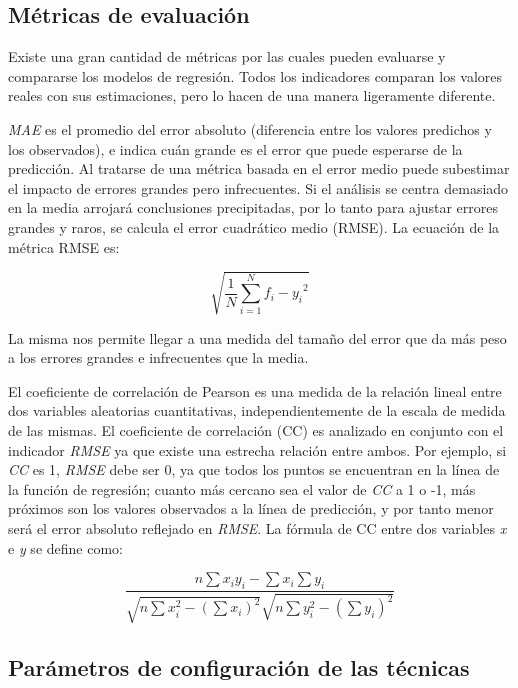 \subsection{Métricas de evaluación\label{subsec:M=0000E9tricas-de-evaluaci=0000F3n}}

Existe una gran cantidad de métricas por las cuales pueden evaluarse
y compararse los modelos de regresión. Todos los indicadores comparan
los valores reales con sus estimaciones, pero lo hacen de una manera
ligeramente diferente. 

\emph{\ac{MAE}} es el promedio del error absoluto (diferencia entre
los valores predichos y los observados), e indica cuán grande es el
error que puede esperarse de la predicción. Al tratarse de una métrica
basada en el error medio puede subestimar el impacto de errores grandes
pero infrecuentes. Si el análisis se centra demasiado en la media
arrojará conclusiones precipitadas, por lo tanto para ajustar errores
grandes y raros, se calcula el error cuadrático medio (\ac{RMSE}).
La ecuación de la métrica \ac{RMSE} es:

\[ \sqrt{\frac{1}{N}\sum_{i=1}^{N}{f_i-y_i}^2}
\]

La misma nos permite llegar a una medida del tamaño del error que
da más peso a los errores grandes e infrecuentes que la media. 

El coeficiente de correlación de Pearson es una medida de la relación
lineal entre dos variables aleatorias cuantitativas, independientemente
de la escala de medida de las mismas. El coeficiente de correlación
(\ac{CC}) es analizado en conjunto con el indicador \emph{\ac{RMSE}}
ya que existe una estrecha relación entre ambos. Por ejemplo, si \emph{\ac{CC}}
es 1, \emph{\ac{RMSE}} debe ser 0, ya que todos los puntos se encuentran
en la línea de la función de regresión; cuanto más cercano sea el
valor de \emph{\ac{CC}} a 1 o -1, más próximos son los valores observados
a la línea de predicción, y por tanto menor será el error absoluto
reflejado en \emph{\ac{RMSE}}. La fórmula de CC entre dos variables
\emph{x} e \emph{y} se define como:

\[
\frac{n\sum x_{i}y_{i}-\sum x_{i}\sum y_{i}}{\sqrt{n\sum x_{i}^{2}-(\sum x_{i})^{2}}\sqrt{n\sum y_{i}^{2}-(\sum y_{i})^{2}}}
\]



\subsection{Parámetros de configuración de las técnicas\label{subsec:Par=0000E1metros-de-configuraci=0000F3nde}}


